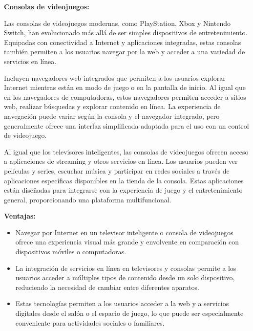\documentclass[12pt]{article}
\begin{document}
                        \textbf{Consolas de videojuegos:}

                        Las consolas de videojuegos modernas, como PlayStation, Xbox y Nintendo Switch, han evolucionado más allá de ser simples dispositivos de entretenimiento. Equipadas con conectividad a Internet y aplicaciones integradas, estas consolas también permiten a los usuarios navegar por la web y acceder a una variedad de servicios en línea.

                        Incluyen navegadores web integrados que permiten a los usuarios explorar Internet mientras están en modo de juego o en la pantalla de inicio. Al igual que en los navegadores de computadoras, estos navegadores permiten acceder a sitios web, realizar búsquedas y explorar contenido en línea. La experiencia de navegación puede variar según la consola y el navegador integrado, pero generalmente ofrece una interfaz simplificada adaptada para el uso con un control de videojuego.

                        Al igual que los televisores inteligentes, las consolas de videojuegos ofrecen acceso a aplicaciones de streaming y otros servicios en línea. Los usuarios pueden ver películas y series, escuchar música y participar en redes sociales a través de aplicaciones específicas disponibles en la tienda de la consola. Estas aplicaciones están diseñadas para integrarse con la experiencia de juego y el entretenimiento general, proporcionando una plataforma multifuncional.

                        \textbf{Ventajas:}

                        \begin{itemize}
                                \item Navegar por Internet en un televisor inteligente o consola de videojuegos ofrece una experiencia visual más grande y envolvente en comparación con dispositivos móviles o computadoras.
                                \item La integración de servicios en línea en televisores y consolas permite a los usuarios acceder a múltiples tipos de contenido desde un solo dispositivo, reduciendo la necesidad de cambiar entre diferentes aparatos.
                                \item Estas tecnologías permiten a los usuarios acceder a la web y a servicios digitales desde el salón o el espacio de juego, lo que puede ser especialmente conveniente para actividades sociales o familiares.
                        \end{itemize}
\end{document}
